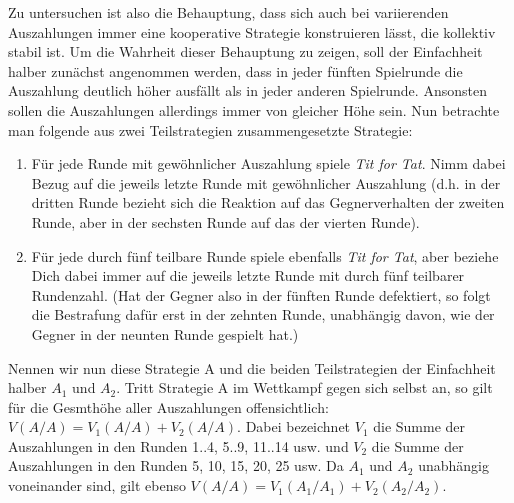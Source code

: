 \documentclass[12pt,a4paper,ngerman]{article}
\begin{document}
Zu untersuchen ist also die Behauptung, dass sich auch bei
variierenden Auszahlungen immer eine kooperative Strategie
konstruieren lässt, die kollektiv stabil ist. Um die Wahrheit dieser
Behauptung zu zeigen, soll der Einfachheit halber zunächst angenommen
werden, dass in jeder fünften Spielrunde die Auszahlung deutlich höher
ausfällt als in jeder anderen Spielrunde. Ansonsten sollen die
Auszahlungen allerdings immer von gleicher Höhe sein. Nun betrachte
man folgende aus zwei Teilstrategien zusammengesetzte Strategie:

\begin{enumerate}

\item Für jede Runde mit gewöhnlicher Auszahlung spiele {\em Tit for
    Tat}. Nimm dabei Bezug auf die jeweils letzte Runde mit gewöhnlicher
  Auszahlung (d.h. in der dritten Runde bezieht sich die Reaktion auf das
  Gegnerverhalten der zweiten Runde, aber in der sechsten Runde auf das der vierten Runde).

\item Für jede durch fünf teilbare Runde spiele ebenfalls {\em Tit for Tat},
  aber beziehe Dich dabei immer auf die jeweils letzte Runde mit durch fünf
  teilbarer Rundenzahl. (Hat der Gegner also in der fünften Runde defektiert,
  so folgt die Bestrafung dafür erst in der zehnten Runde, unabhängig davon, wie
  der Gegner in der neunten Runde gespielt hat.)

\end{enumerate}

Nennen wir nun diese Strategie A und die beiden Teilstrategien der
Einfachheit halber $A_1$ und $A_2$. Tritt Strategie A im Wettkampf
gegen sich selbst an, so gilt für die Gesmthöhe aller Auszahlungen
offensichtlich: $V(A/A) = V_1(A/A) + V_2(A/A)$. Dabei bezeichnet $V_1$
die Summe der Auszahlungen in den Runden 1..4, 5..9, 11..14 usw. und
$V_2$ die Summe der Auszahlungen in den Runden 5, 10, 15, 20, 25
usw. Da $A_1$ und $A_2$ unabhängig voneinander sind, gilt ebenso
$V(A/A) = V_1(A_1/A_1) + V_2(A_2/A_2)$.
\end{document}
